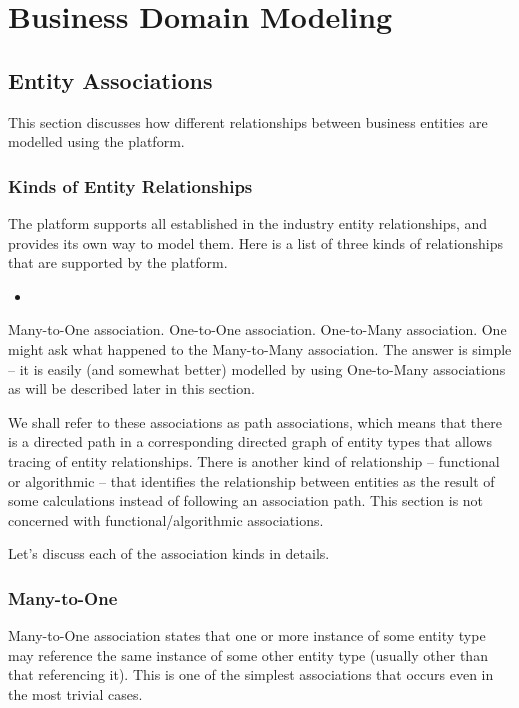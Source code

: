 \chapter{Business Domain Modeling}\label{ch01:02}

\section{Entity Associations}

  This section discusses how different relationships between business entities are modelled using the platform.

\subsection{Kinds of Entity Relationships}

  The platform supports all established in the industry entity relationships, and provides its own way to model them. Here is a list of three kinds of relationships that are supported by the platform.
  \begin{itemize}
   \item 
  \end{itemize}

Many-to-One association.
One-to-One association.
One-to-Many association.
One might ask what happened to the Many-to-Many association. The answer is simple -- it is easily (and somewhat better) modelled by using One-to-Many associations as will be described later in this section.

We shall refer to these associations as path associations, which means that there is a directed path in a corresponding directed graph of entity types that allows tracing of entity relationships. There is another kind of relationship -- functional or algorithmic -- that identifies the relationship between entities as the result of some  calculations instead of following an association path. This section is not concerned with functional/algorithmic associations.

Let's discuss each of the association kinds in details.

\subsection{Many-to-One}

  Many-to-One association states that one or more instance of some entity type may reference the same instance of some other entity type (usually other than that referencing it). This is one of the simplest associations that occurs even in the most trivial cases.

